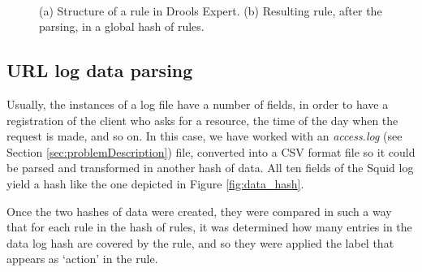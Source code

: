 \documentclass{llncs}
\begin{document}
\begin{figure}[htb]
\centering
{}
~
\caption{(a) Structure of a rule in Drools Expert. (b) Resulting rule, after the parsing, in a global hash of rules. \label{fig:drools_hash}}
\end{figure}

%
\subsection{URL log data parsing}
\label{subsec:logparsing}

\noindent Usually, the instances of a log file have a number of fields, in order to have a registration of the client who asks for a resource, the time of the day when the request is made, and so on. In this case, we have worked with an \textit{access.log} (see Section \ref{sec:problemDescription}) file, converted into a CSV format file so it could be parsed and transformed in another hash of data. All ten fields of the Squid log yield a hash like the one depicted in Figure \ref{fig:data_hash}.

Once the two hashes of data were created, they were compared in such a way that for each rule in the hash of rules, it was determined how many entries in the data log hash are covered by the rule, and so they were applied the label that appears as `action' in the rule.
\end{document}
